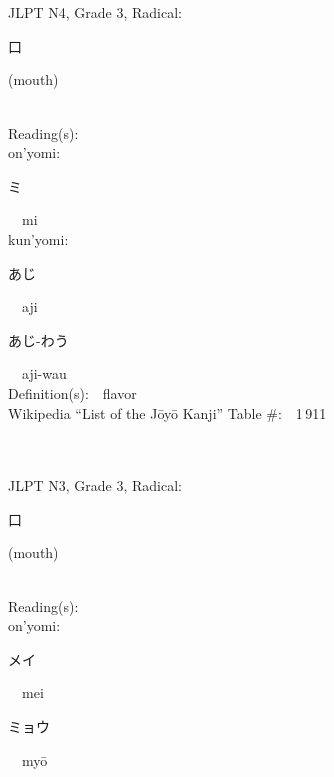 \begin{multicols}{2}
\ \ \\
{\fontsize{34pt}{40pt}  }\ \ \\  %
{JLPT N4, Grade 3, Radical:\ \ {\begin{CJK}{UTF8}{min} 口 \end{CJK}} (mouth) } \\
Reading(s):\ \ \\
{\hspace*{1em}}on'yomi:\ \ \\
{\hspace*{2em}}{\begin{CJK}{UTF8}{min} ミ \end{CJK}}\ \ mi\ \ \\
{\hspace*{1em}}kun'yomi:\ \ \\
{\hspace*{2em}}{\begin{CJK}{UTF8}{min} あじ \end{CJK}}\ \ aji\ \ \\
{\hspace*{2em}}{\begin{CJK}{UTF8}{min} あじ-わう \end{CJK}}\ \ aji-wau\ \ \\
Definition(s):\ \ flavor \\
Wikipedia ``List of the J\=oy\=o Kanji'' Table \#:\ \ 1\,911 \\
\ \ \\
{\fontsize{34pt}{40pt}  }\ \ \\  %
{JLPT N3, Grade 3, Radical:\ \ {\begin{CJK}{UTF8}{min} 口 \end{CJK}} (mouth) } \\
Reading(s):\ \ \\
{\hspace*{1em}}on'yomi:\ \ \\
{\hspace*{2em}}{\begin{CJK}{UTF8}{min} メイ \end{CJK}}\ \ mei\ \ \\
{\hspace*{2em}}{\begin{CJK}{UTF8}{min} ミョウ \end{CJK}}\ \ my\=o\ \ \\

\end{multicols}
